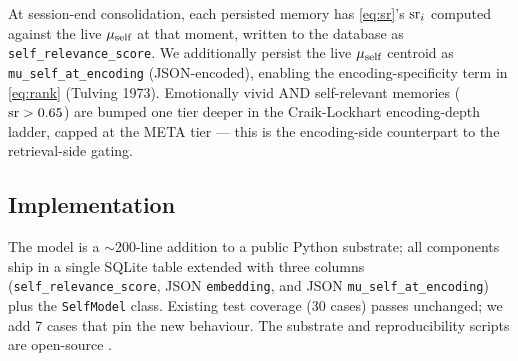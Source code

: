 At session-end consolidation, each persisted memory has
\cref{eq:sr}'s $\mathrm{sr}_i$ computed against the live $\mu_{\text{self}}$ at that
moment, written to the database as \texttt{self\_relevance\_score}.
We additionally persist the live $\mu_{\text{self}}$ centroid as
\texttt{mu\_self\_at\_encoding} (JSON-encoded), enabling the
encoding-specificity term in \cref{eq:rank} (Tulving 1973).
Emotionally vivid AND self-relevant memories ($\mathrm{sr} > 0.65$) are
bumped one tier deeper in the Craik-Lockhart \cite{craik1972lop}
encoding-depth ladder, capped at the META tier --- this is the
encoding-side counterpart to the retrieval-side gating.

\subsection{Implementation}

The model is a $\sim$200-line addition to a public Python substrate;
all components ship in a single SQLite table extended with three columns
(\texttt{self\_relevance\_score}, JSON \texttt{embedding}, and JSON
\texttt{mu\_self\_at\_encoding}) plus the \texttt{SelfModel} class. Existing test coverage (30 cases) passes
unchanged; we add 7 cases that pin the new behaviour. The substrate
and reproducibility scripts are open-source
\cite{anon_substrate}.
